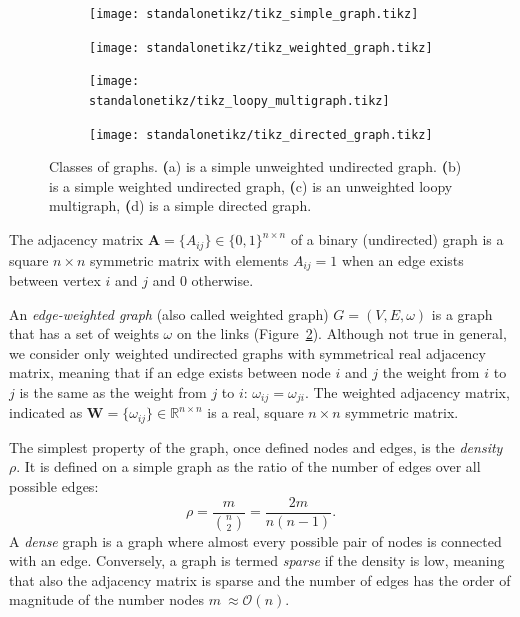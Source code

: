 \begin{figure}[htb!]
\centering
	\begin{subfigure}[hb]{0.4\textwidth}\centering
		\texttt{[image: standalonetikz/tikz\_simple\_graph.tikz]}
		\caption{}
		\label{fig:simple_unweighted_graph}
	\end{subfigure}
	\begin{subfigure}[hb]{0.4\textwidth}\centering
	\texttt{[image: standalonetikz/tikz\_weighted\_graph.tikz]}
	\caption{}
	\label{fig:simple_weighted_graph}
	\end{subfigure}
	\begin{subfigure}[hb]{0.4\textwidth}\centering
	\texttt{[image: standalonetikz/tikz\_loopy\_multigraph.tikz]}
	\caption{}
	\label{fig:loopy_multigraph}
	\end{subfigure}
	\begin{subfigure}[hb]{0.4\textwidth}\centering
	\texttt{[image: standalonetikz/tikz\_directed\_graph.tikz]}
	\caption{}
	\label{fig:directedgraph}
	\end{subfigure}
	\caption{Classes of graphs. {\textbf (a)} is a simple unweighted undirected graph. {\textbf (b)} is a simple weighted undirected graph, {\textbf (c)} is an unweighted loopy multigraph, {\textbf (d)} is a simple directed graph.}
\end{figure}

The adjacency matrix $\mathbf{A}=\{A_{ij}\} \in \{0,1\}^{n \times n}$ of a binary (undirected) graph is a square $n\times n$ symmetric matrix with elements $A_{ij}=1$ when an edge exists between vertex $i$ and $j$ and $0$ otherwise.

An \emph{edge-weighted graph} (also called weighted graph) $G=(V,E,\omega)$ is a graph that has a set of weights $\omega$ on the links (Figure~\ref{fig:simple_weighted_graph}). Although not true in general, we consider only weighted undirected graphs with symmetrical real adjacency matrix, meaning that if an edge exists between node $i$ and $j$ the weight from $i$ to $j$ is the same as the weight from $j$ to $i$: $\omega_{ij}=\omega_{ji}$. The weighted adjacency matrix,  indicated as $\mathbf{W}=\{ \omega_{ij} \} \in \mathbb{R}^{n\times n}$ is a real, square $n \times n$ symmetric matrix.

The simplest property of the graph, once defined nodes and edges, is the \emph{density} $\rho$. It is defined on a simple graph as the ratio of the number of edges over all possible edges:
\begin{equation}
\rho = \frac{m}{\binom{n}{2}} = \frac{2m}{n(n-1)}.
\end{equation}
A \emph{dense} graph is a graph where almost every possible pair of nodes is connected with an edge. Conversely, a graph is termed \emph{sparse} if the density is low, meaning that also the adjacency matrix is sparse and the number of edges has the order of magnitude of the number nodes $m ~\approx \mathcal{O}(n)$.

